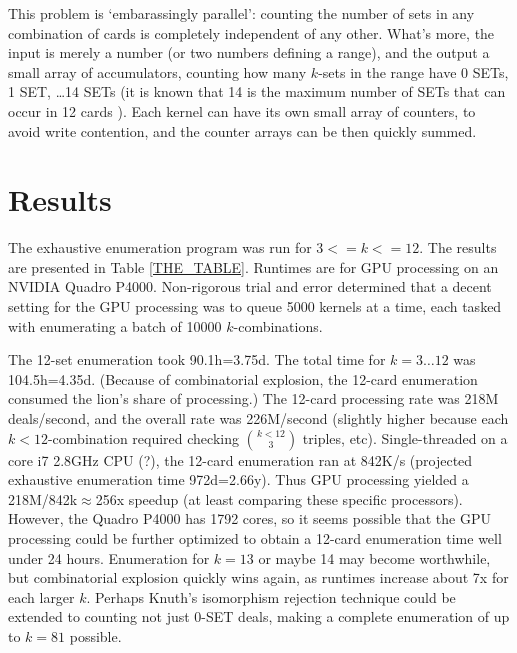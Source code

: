 \documentclass[10pt]{amsart}
\begin{document}
This problem is `embarassingly parallel': counting the number of sets in any
combination of cards is completely independent of any other. What's more, the
input is merely a number (or two numbers defining a range), and the output a
small array of accumulators, counting how many $k$-sets in the range have 0
SETs, 1 SET, \ldots 14 SETs (it is known that 14 is the maximum number of SETs
that can occur in 12 cards \cite{VINCI}). Each kernel can have its own small
array of counters, to avoid write contention, and the counter arrays can be then
quickly summed.

\section{Results}
The exhaustive enumeration program was run for $3<=k<=12$. The results are
presented in Table \ref{THE_TABLE}. Runtimes are for GPU processing on an
NVIDIA Quadro P4000. Non-rigorous trial and error determined that a decent
setting for the GPU processing was to queue 5000 kernels at a time, each tasked
with enumerating a batch of 10000 $k$-combinations.



The 12-set enumeration took 90.1h=3.75d. The total time for $k=3\ldots 12$ was
104.5h=4.35d. (Because of combinatorial explosion, the 12-card enumeration
consumed the lion's share of processing.) The 12-card processing rate was 218M
deals/second, and the overall rate was 226M/second (slightly higher because each
$k<12$-combination required checking $\binom{k<12}{3}$ triples,
etc). Single-threaded on a core i7 2.8GHz CPU (?), the 12-card enumeration ran
at 842K/s (projected exhaustive enumeration time 972d=2.66y). Thus GPU
processing yielded a 218M/842k$\approx$256x speedup (at least comparing these specific
processors). However, the Quadro P4000 has 1792 cores, so it seems possible that
the GPU processing could be further optimized to obtain a 12-card enumeration
time well under 24 hours. Enumeration for $k=13$ or maybe 14 may become
worthwhile, but combinatorial explosion quickly wins again, as runtimes increase
about 7x for each larger $k$. Perhaps Knuth's isomorphism rejection technique
could be extended to counting not just 0-SET deals, making a complete
enumeration of up to $k=81$ possible.
\end{document}
